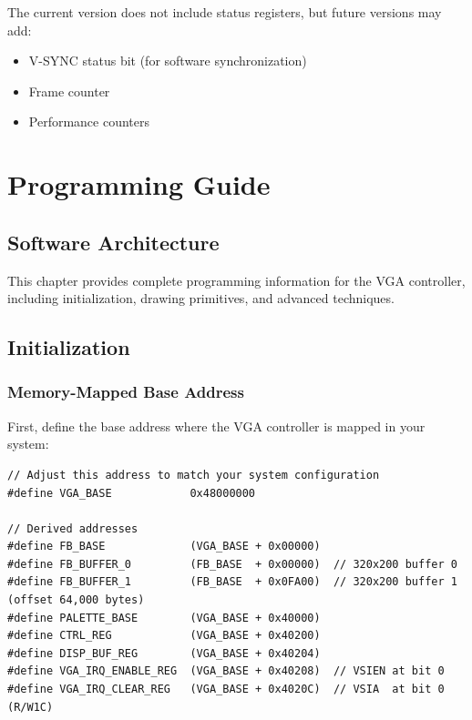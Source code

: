 \documentclass[11pt,letterpaper]{report}
\begin{document}
The current version does not include status registers, but future versions may add:

\begin{itemize}
    \item V-SYNC status bit (for software synchronization)
    \item Frame counter
    \item Performance counters
\end{itemize}

\chapter{Programming Guide}
\label{ch:programming}

\section{Software Architecture}

This chapter provides complete programming information for the VGA controller, including initialization, drawing primitives, and advanced techniques.

\section{Initialization}

\subsection{Memory-Mapped Base Address}

First, define the base address where the VGA controller is mapped in your system:

\begin{lstlisting}[style=c]
// Adjust this address to match your system configuration
#define VGA_BASE            0x48000000

// Derived addresses
#define FB_BASE             (VGA_BASE + 0x00000)
#define FB_BUFFER_0         (FB_BASE  + 0x00000)  // 320x200 buffer 0
#define FB_BUFFER_1         (FB_BASE  + 0x0FA00)  // 320x200 buffer 1 (offset 64,000 bytes)
#define PALETTE_BASE        (VGA_BASE + 0x40000)
#define CTRL_REG            (VGA_BASE + 0x40200)
#define DISP_BUF_REG        (VGA_BASE + 0x40204)
#define VGA_IRQ_ENABLE_REG  (VGA_BASE + 0x40208)  // VSIEN at bit 0
#define VGA_IRQ_CLEAR_REG   (VGA_BASE + 0x4020C)  // VSIA  at bit 0 (R/W1C)
\end{lstlisting}
\end{document}
